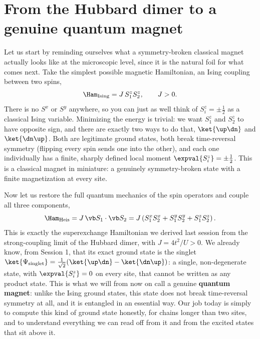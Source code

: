 \documentclass[all_sessions.tex]{subfiles}
\begin{document}
\section{From the Hubbard dimer to a genuine quantum magnet}
\label{sec:setup}
Let us start by reminding ourselves what a symmetry-broken classical magnet actually looks like at the
microscopic level, since it is the natural foil for what comes next. Take the simplest possible
magnetic Hamiltonian, an Ising coupling between two spins,
\begin{equation}
  \Ham_{\mathrm{Ising}} = J\, S_1^z S_2^z, \qquad J>0.
  \label{eq:isingdimer}
\end{equation}
There is no $S^x$ or $S^y$ anywhere, so you can just as well think of $S_i^z=\pm\tfrac12$ as a classical
Ising variable. Minimizing the energy is trivial: we want $S_1^z$ and $S_2^z$ to have opposite sign, and
there are exactly two ways to do that, $\ket{\up\dn}$ and $\ket{\dn\up}$. Both are legitimate ground
states, both break time-reversal symmetry (flipping every spin sends one into the other), and each one
individually has a finite, sharply defined local moment $\expval{S_i^z}=\pm\tfrac12$. This is a classical
magnet in miniature: a genuinely symmetry-broken state with a finite magnetization at every site.

Now let us restore the full quantum mechanics of the spin operators and couple all three components,
\begin{equation}
  \Ham_{\mathrm{Heis}} = J\, \vb S_1\cdot\vb S_2 = J\left(S_1^xS_2^x + S_1^yS_2^y + S_1^zS_2^z\right).
  \label{eq:heisdimer}
\end{equation}
This is exactly the superexchange Hamiltonian we derived last session from the strong-coupling limit of
the Hubbard dimer, with $J=4t^2/U>0$. We already know, from Session 1, that its exact ground state is the
singlet $\ket{\Psi_{\mathrm{singlet}}}=\tfrac{1}{\sqrt2}(\ket{\up\dn}-\ket{\dn\up})$: a single,
non-degenerate state, with $\expval{S_i^z}=0$ on every site, that cannot be written as any product state.
This is what we will from now on call a genuine \textbf{quantum magnet}: unlike the Ising ground states,
this state does not break time-reversal symmetry at all, and it is entangled in an essential way.
Our job today is simply to compute this kind of ground state honestly, for chains longer than two sites,
and to understand everything we can read off from it and from the excited states that sit above it.
\end{document}
